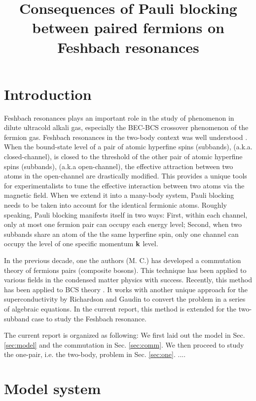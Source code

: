 \documentclass[11pt]{article} %
\title{Consequences of Pauli blocking between paired fermions on Feshbach resonances}
\begin{document}
\maketitle
\section{Introduction}
Feshbach resonances plays an important role in the study of  phenomenon in dilute ultracold alkali gas, especially the BEC-BCS crossover phenomenon of the fermion gas. Feshbach resonances in the  two-body context was well understood \cite{Fano,nuclear, Leggett,ChinRMP}. When the bound-state level of a pair of  atomic hyperfine spins (subbands), (a.k.a. closed-channel), is closed to the threshold of the other pair of atomic hyperfine spins (subbands), (a.k.a open-channel),  the   effective attraction between two atoms in the open-channel are drastically modified.  This provides a unique tools for experimentalists to tune the effective interaction between two atoms via the magnetic field.    When we extend it into a many-body system, Pauli blocking needs to be taken into account for the identical fermionic atoms.  Roughly speaking, Pauli blocking manifests itself in two ways: First, within each channel, only at most one fermion pair can occupy each energy level;  Second, when two subbands share an atom of the the same hyperfine spin, only one channel can occupy the level of one specific momentum  $\mathbf{k}$ level.

In the previous decade, one the authors (M. C.)  has developed a commutation theory of fermions pairs (composite bosons)\cite{CobosonPhysicsReports}.  This technique has been applied to various fields in the condensed matter physics with success.  Recently, this method has been applied to BCS theory \cite{combescotBCS,CobosonBcsRich}.  It works with another unique approach for the superconductivity by Richardson \cite{Richardson1, Richardson2, Richardson3} and Gaudin \cite{Gaudin} to convert the problem in a series of algebraic equations.  In the current report, this method is extended for the two-subband case to study the Feshbach resonance.  

The current report is organized as following: We first laid out the model in Sec. \ref{sec:model} and the commutation in Sec. \ref{sec:comm}.  We then proceed to study the one-pair, i.e. the two-body, problem in Sec. \ref{sec:one}. ....
\section{Model system \label{sec:model}}
\end{document}
